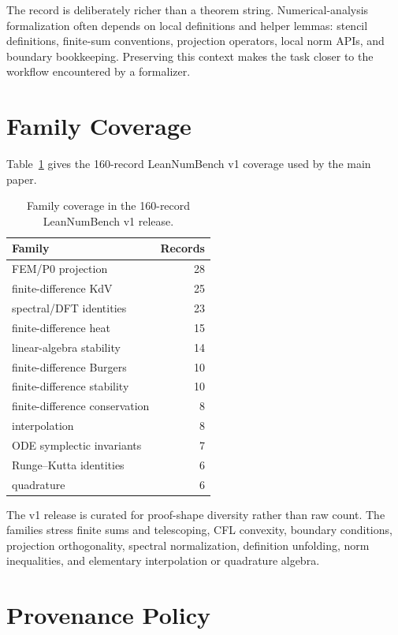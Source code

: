 The record is deliberately richer than a theorem string. Numerical-analysis
formalization often depends on local definitions and helper lemmas: stencil
definitions, finite-sum conventions, projection operators, local norm APIs, and
boundary bookkeeping. Preserving this context makes the task closer to the
workflow encountered by a formalizer.

\section{Family Coverage}

Table~\ref{tab:supp-family-coverage} gives the 160-record LeanNumBench v1 coverage
used by the main paper.

\begin{table}[htbp]
\centering
\caption{Family coverage in the 160-record LeanNumBench v1 release.}
\label{tab:supp-family-coverage}
\begin{tabular}{lr}
\toprule
Family & Records\\
\midrule
FEM/P0 projection & 28\\
finite-difference KdV & 25\\
spectral/DFT identities & 23\\
finite-difference heat & 15\\
linear-algebra stability & 14\\
finite-difference Burgers & 10\\
finite-difference stability & 10\\
finite-difference conservation & 8\\
interpolation & 8\\
ODE symplectic invariants & 7\\
Runge--Kutta identities & 6\\
quadrature & 6\\
\bottomrule
\end{tabular}
\end{table}

The v1 release is curated for proof-shape diversity rather than raw
count. The families stress finite sums and telescoping, CFL convexity,
boundary conditions, projection orthogonality, spectral normalization,
definition unfolding, norm inequalities, and elementary interpolation or
quadrature algebra.

\section{Provenance Policy}

